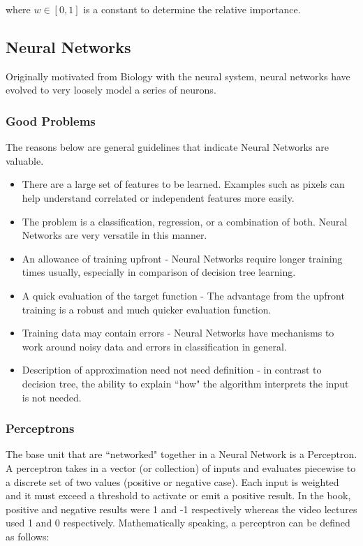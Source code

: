 \documentclass[11pt]{article}
\begin{document}
where $w \in [0, 1]$ is a constant to determine the relative importance.

\subsection{Neural Networks}

Originally motivated from Biology with the neural system, neural networks have evolved to very loosely model a series of neurons.

\subsubsection{Good Problems}

The reasons below are general guidelines that indicate Neural Networks are valuable. 

\begin{itemize}
\item There are a large set of features to be learned. Examples such as pixels can help understand correlated or independent features more easily.
\item The problem is a classification, regression, or a combination of both. Neural Networks are very versatile in this manner.
\item An allowance of training upfront - Neural Networks require longer training times usually, especially in comparison of decision tree learning.
\item A quick evaluation of the target function - The advantage from the upfront training is a robust and much quicker evaluation function.
\item Training data may contain errors - Neural Networks have mechanisms to work around noisy data and errors in classification in general.
\item Description of approximation need not need definition - in contrast to decision tree, the ability to explain ``how" the algorithm interprets the input is not needed.
\end{itemize}

\subsubsection{Perceptrons}

The base unit that are ``networked" together in a Neural Network is a Perceptron. A perceptron takes in a vector (or collection) of inputs and evaluates piecewise to a discrete set of two values (positive or negative case). Each input is weighted and it must exceed a threshold to activate or emit a positive result. In the book, positive and negative results were 1 and -1 respectively whereas the video lectures used 1 and 0 respectively. Mathematically speaking, a perceptron can be defined as follows:
\end{document}
